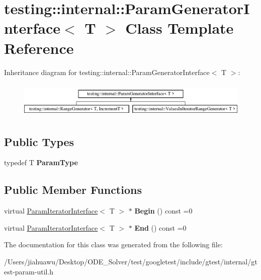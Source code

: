 \hypertarget{classtesting_1_1internal_1_1_param_generator_interface}{}\section{testing\+:\+:internal\+:\+:Param\+Generator\+Interface$<$ T $>$ Class Template Reference}
\label{classtesting_1_1internal_1_1_param_generator_interface}
Inheritance diagram for testing\+:\+:internal\+:\+:Param\+Generator\+Interface$<$ T $>$\+:\begin{figure}[H]
\begin{center}
\leavevmode
\includegraphics[height=1.733746cm]{classtesting_1_1internal_1_1_param_generator_interface}
\end{center}
\end{figure}
\subsection*{Public Types}
\begin{DoxyCompactItemize}
\item 
\mbox{\label{classtesting_1_1internal_1_1_param_generator_interface_ab33d2ea424c50beaf503cb125b3cd003}} 
typedef T {\bfseries Param\+Type}
\end{DoxyCompactItemize}
\subsection*{Public Member Functions}
\begin{DoxyCompactItemize}
\item 
\mbox{\label{classtesting_1_1internal_1_1_param_generator_interface_ae1de83b16fe9a53c67778a026c6a9569}} 
virtual \mbox{\hyperlink{classtesting_1_1internal_1_1_param_iterator_interface}{Param\+Iterator\+Interface}}$<$ T $>$ $\ast$ {\bfseries Begin} () const =0
\item 
\mbox{\label{classtesting_1_1internal_1_1_param_generator_interface_afa7211b74990e11d3fc7ad4e7113da4f}} 
virtual \mbox{\hyperlink{classtesting_1_1internal_1_1_param_iterator_interface}{Param\+Iterator\+Interface}}$<$ T $>$ $\ast$ {\bfseries End} () const =0
\end{DoxyCompactItemize}


The documentation for this class was generated from the following file\+:\begin{DoxyCompactItemize}
\item 
/\+Users/jiahuawu/\+Desktop/\+O\+D\+E\+\_\+\+Solver/test/googletest/include/gtest/internal/gtest-\/param-\/util.\+h\end{DoxyCompactItemize}
